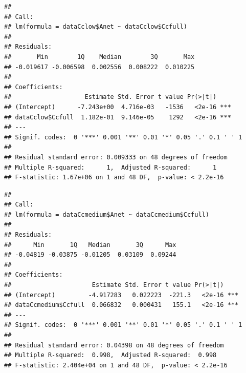 \documentclass[
]{krantz}
\makeatletter
\newenvironment{Shaded}{\begin{snugshade}}{\end{snugshade}}
\newcommand{\DecValTok}[1]{\textcolor[rgb]{0.00,0.00,0.81}{#1}}
\newcommand{\FunctionTok}[1]{\textcolor[rgb]{0.00,0.00,0.00}{#1}}
\newcommand{\NormalTok}[1]{#1}
\newcommand{\OtherTok}[1]{\textcolor[rgb]{0.56,0.35,0.01}{#1}}
\newcommand{\SpecialCharTok}[1]{\textcolor[rgb]{0.00,0.00,0.00}{#1}}
\newenvironment{kframe}{%
\medskip{}
\setlength{\fboxsep}{.8em}
 \def\at@end@of@kframe{}%
 \ifinner\ifhmode%
  \def\at@end@of@kframe{\end{minipage}}%
  \begin{minipage}{\columnwidth}%
 \fi\fi%
 \def\FrameCommand##1{\hskip\@totalleftmargin \hskip-\fboxsep
 \colorbox{shadecolor}{##1}\hskip-\fboxsep
     \hskip-\linewidth \hskip-\@totalleftmargin \hskip\columnwidth}%
 \MakeFramed {\advance\hsize-\width
   \@totalleftmargin\z@ \linewidth\hsize
   \@setminipage}}%
 {\par\unskip\endMakeFramed%
 \at@end@of@kframe}
\renewenvironment{Shaded}{\begin{kframe}}{\end{kframe}}
\makeatother
\begin{document}
\begin{Shaded}
\end{Shaded}

\begin{verbatim}
## 
## Call:
## lm(formula = dataCclow$Anet ~ dataCclow$Ccfull)
## 
## Residuals:
##       Min        1Q    Median        3Q       Max 
## -0.019617 -0.006598  0.002556  0.008222  0.010225 
## 
## Coefficients:
##                    Estimate Std. Error t value Pr(>|t|)    
## (Intercept)      -7.243e+00  4.716e-03   -1536   <2e-16 ***
## dataCclow$Ccfull  1.182e-01  9.146e-05    1292   <2e-16 ***
## ---
## Signif. codes:  0 '***' 0.001 '**' 0.01 '*' 0.05 '.' 0.1 ' ' 1
## 
## Residual standard error: 0.009333 on 48 degrees of freedom
## Multiple R-squared:      1,  Adjusted R-squared:      1 
## F-statistic: 1.67e+06 on 1 and 48 DF,  p-value: < 2.2e-16
\end{verbatim}

\begin{Shaded}
\end{Shaded}

\begin{verbatim}
## 
## Call:
## lm(formula = dataCcmedium$Anet ~ dataCcmedium$Ccfull)
## 
## Residuals:
##      Min       1Q   Median       3Q      Max 
## -0.04819 -0.03875 -0.01205  0.03109  0.09244 
## 
## Coefficients:
##                      Estimate Std. Error t value Pr(>|t|)    
## (Intercept)         -4.917283   0.022223  -221.3   <2e-16 ***
## dataCcmedium$Ccfull  0.066832   0.000431   155.1   <2e-16 ***
## ---
## Signif. codes:  0 '***' 0.001 '**' 0.01 '*' 0.05 '.' 0.1 ' ' 1
## 
## Residual standard error: 0.04398 on 48 degrees of freedom
## Multiple R-squared:  0.998,  Adjusted R-squared:  0.998 
## F-statistic: 2.404e+04 on 1 and 48 DF,  p-value: < 2.2e-16
\end{verbatim}
\end{document}
